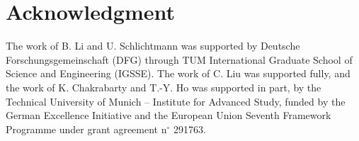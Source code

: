 \section*{Acknowledgment}

The work of B. Li and U. Schlichtmann was supported by Deutsche
Forschungsgemeinschaft (DFG) through TUM International Graduate School of
Science and Engineering (IGSSE).
The work of C. Liu was supported fully, and the work of 
K. Chakrabarty and T.-Y. Ho was supported in part, by the Technical University
of Munich -- Institute for Advanced Study, funded by the German
Excellence Initiative and the European Union Seventh Framework Programme under
grant agreement n$^\circ$ 291763.

